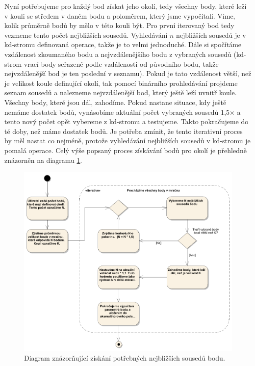 \documentclass[11pt,twoside,a4paper]{book}
\begin{document}
Nyní potřebujeme pro každý bod získat jeho okolí, tedy všechny body, které leží v kouli se středem v daném bodu a poloměrem, který jsme vypočítali. Víme, kolik průměrně bodů by mělo v této kouli být. Pro první iterovaný bod tedy vezmeme tento počet nejbližších sousedů. Vyhledávání $n$ nejbližších sousedů je v kd-stromu definovaná operace, takže je to velmi jednoduché. Dále si spočítáme vzdálenost zkoumaného bodu a nejvzdálenějšího bodu z vybraných sousedů (kd-strom vrací body seřazené podle vzdálenosti od původního bodu, takže nejvzdálenější bod je ten poslední v seznamu). Pokud je tato vzdálenost větší, než je velikost koule definující okolí, tak pomocí binárního prohledávání projdeme seznam sousedů a nalezneme nejvzdálenější bod, který ještě leží uvnitř koule. Všechny body, které jsou dál, zahodíme. Pokud nastane situace, kdy ještě nemáme dostatek bodů, vynásobíme aktuální počet vybraných sousedů 1,5$\times$ a tento nový počet opět vybereme z kd-stromu a testujeme. Takto pokračujeme do té doby, než máme dostatek bodů. Je potřeba zmínit, že tento iterativní proces by měl nastat co nejméně, protože vyhledávání nejbližších sousedů v kd-stromu je pomalá operace. Celý výše popsaný proces získávání bodů pro okolí je přehledně znázorněn na diagramu \ref{fig:diag-okoli}.

\begin{figure}[ht]
\begin{center}
\includegraphics[width=\textwidth]{figures/okoli-diagram-algoritmus}
\caption{Diagram znázorňující získání potřebných nejbližších sousedů bodu.}
\label{fig:diag-okoli}
\end{center}
\end{figure}
\end{document}
